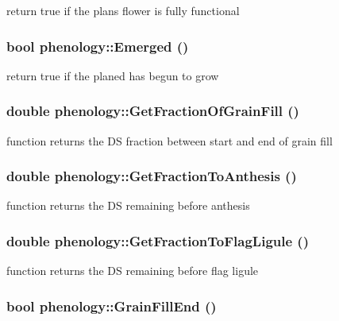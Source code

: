 return true if the plans flower is fully functional \hypertarget{classphenology_a514ca53b35d3dfc3e8dc1b4841d221cf}{
\subsubsection[{Emerged}]{\setlength{\rightskip}{0pt plus 5cm}bool phenology::Emerged ()}}
\label{classphenology_a514ca53b35d3dfc3e8dc1b4841d221cf}


return true if the planed has begun to grow \hypertarget{classphenology_ae1e41d673ae323dc45240665b167b14e}{
\subsubsection[{GetFractionOfGrainFill}]{\setlength{\rightskip}{0pt plus 5cm}double phenology::GetFractionOfGrainFill ()}}
\label{classphenology_ae1e41d673ae323dc45240665b167b14e}
function returns the DS fraction between start and end of grain fill \hypertarget{classphenology_aad2f655d897ddb69dadb719ce046f74f}{
\subsubsection[{GetFractionToAnthesis}]{\setlength{\rightskip}{0pt plus 5cm}double phenology::GetFractionToAnthesis ()}}
\label{classphenology_aad2f655d897ddb69dadb719ce046f74f}
function returns the DS remaining before anthesis \hypertarget{classphenology_a1745a1f68ead72820ce0b9bb3272e7b1}{
\subsubsection[{GetFractionToFlagLigule}]{\setlength{\rightskip}{0pt plus 5cm}double phenology::GetFractionToFlagLigule ()}}
\label{classphenology_a1745a1f68ead72820ce0b9bb3272e7b1}
function returns the DS remaining before flag ligule \hypertarget{classphenology_aa2966766123b0b7b2d948fd74ecd057b}{
\subsubsection[{GrainFillEnd}]{\setlength{\rightskip}{0pt plus 5cm}bool phenology::GrainFillEnd ()}}
\label{classphenology_aa2966766123b0b7b2d948fd74ecd057b}


